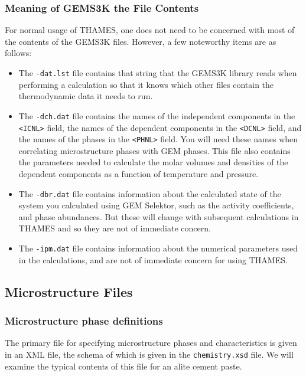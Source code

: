 \documentclass{article}
\begin{document}
\normalsize{ }
\subsubsection{Meaning of GEMS3K the File Contents}
For normal usage of THAMES, one does not need to be concerned with most of the contents of
the GEMS3K files.  However, a few noteworthy items are as follows:
\begin{itemize}
    \item The \verb!-dat.lst! file contains that string that the GEMS3K library reads when
        performing a calculation so that it knows which other files contain the thermodynamic
        data it needs to run.
    \item The \verb!-dch.dat! file contains the names of the independent components
        in the \verb!<ICNL>! field, the names of the dependent components in the
        \verb!<DCNL>! field, and the names of the phases in the \verb!<PHNL>! field.
        You will need these names when correlating microstructure phases with GEM phases.
        This file also contains the parameters needed to calculate the molar volumes
        and densities of the dependent components as a function of temperature and pressure.
    \item The \verb!-dbr.dat! file contains information about the calculated state of
        the system you calculated using GEM Selektor, such as the activity coefficients,
        and phase abundances.  But these will change with subsequent calculations in
        THAMES and so they are not of immediate concern.
    \item The \verb!-ipm.dat! file contains information about the numerical parameters
        used in the calculations, and are not of immediate concern for using THAMES.
\end{itemize}


\subsection{Microstructure Files}
\subsubsection{Microstructure phase definitions}
The primary file for specifying microstructure phases and characteristics is given
in an XML file, the schema of which is given in the \verb!chemistry.xsd! file.
We will examine the typical contents of this file for an alite cement paste.
\end{document}
